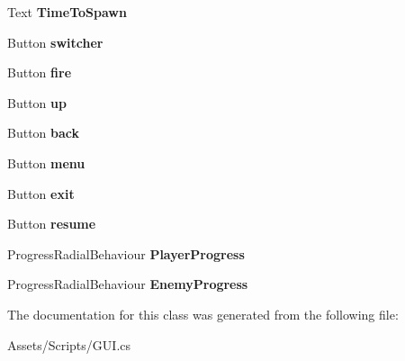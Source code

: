 \begin{DoxyCompactItemize}
\item 
\hypertarget{class_g_u_i_a84fac3b206a8f91eac0479620f1cf97a}{}Text {\bfseries Time\+To\+Spawn}\label{class_g_u_i_a84fac3b206a8f91eac0479620f1cf97a}

\item 
\hypertarget{class_g_u_i_a81f6c582579d7cb434a172d24ecf8f67}{}Button {\bfseries switcher}\label{class_g_u_i_a81f6c582579d7cb434a172d24ecf8f67}

\item 
\hypertarget{class_g_u_i_a5304ab8725ba877636e10071c0ec9d9e}{}Button {\bfseries fire}\label{class_g_u_i_a5304ab8725ba877636e10071c0ec9d9e}

\item 
\hypertarget{class_g_u_i_a4104c57779af29adc9ff9a2edb007054}{}Button {\bfseries up}\label{class_g_u_i_a4104c57779af29adc9ff9a2edb007054}

\item 
\hypertarget{class_g_u_i_a7b53d536a07c32e3a423b66f154a6acf}{}Button {\bfseries back}\label{class_g_u_i_a7b53d536a07c32e3a423b66f154a6acf}

\item 
\hypertarget{class_g_u_i_a87d92cb22495a943ed5d91036cdb4281}{}Button {\bfseries menu}\label{class_g_u_i_a87d92cb22495a943ed5d91036cdb4281}

\item 
\hypertarget{class_g_u_i_a02d946ffc3ea672a6a658037bdc8aed2}{}Button {\bfseries exit}\label{class_g_u_i_a02d946ffc3ea672a6a658037bdc8aed2}

\item 
\hypertarget{class_g_u_i_a7480cb3b950a7c343970740971afd41e}{}Button {\bfseries resume}\label{class_g_u_i_a7480cb3b950a7c343970740971afd41e}

\item 
\hypertarget{class_g_u_i_a31c2c163e48439dafcba94d158c7bb69}{}Progress\+Radial\+Behaviour {\bfseries Player\+Progress}\label{class_g_u_i_a31c2c163e48439dafcba94d158c7bb69}

\item 
\hypertarget{class_g_u_i_a496c6b325eb5395c59a6031bdcbee7fb}{}Progress\+Radial\+Behaviour {\bfseries Enemy\+Progress}\label{class_g_u_i_a496c6b325eb5395c59a6031bdcbee7fb}

\end{DoxyCompactItemize}


The documentation for this class was generated from the following file\+:\begin{DoxyCompactItemize}
\item 
Assets/\+Scripts/G\+U\+I.\+cs\end{DoxyCompactItemize}
